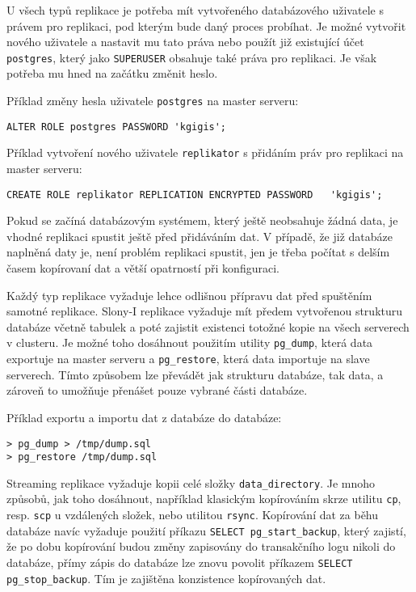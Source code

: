       U všech typů replikace je potřeba mít vytvořeného databázového uživatele s právem pro replikaci, pod kterým bude daný proces probíhat. Je možné vytvořit nového uživatele a nastavit mu tato práva nebo použít již existující účet \texttt{postgres}, který jako \texttt{SUPERUSER} obsahuje také práva pro replikaci. Je však potřeba mu hned na začátku změnit heslo.

Příklad změny hesla uživatele \texttt{postgres} na master serveru:
\begin{lstlisting}
ALTER ROLE postgres PASSWORD 'kgigis';
\end{lstlisting}

Příklad vytvoření nového uživatele \texttt{replikator} s přidáním práv pro replikaci na master serveru: 
\begin{lstlisting}[]
CREATE ROLE replikator REPLICATION ENCRYPTED PASSWORD   'kgigis';
\end{lstlisting}

Pokud se začíná databázovým systémem, který ještě neobsahuje žádná data, je vhodné replikaci spustit ještě před přidáváním dat. V případě, že již databáze naplněná daty je, není problém replikaci spustit, jen je třeba počítat s delším časem kopírovaní dat a větší opatrností při konfiguraci. 

Každý typ replikace vyžaduje lehce odlišnou přípravu dat před spuštěním samotné replikace. 
Slony-I replikace vyžaduje mít předem vytvořenou strukturu databáze včetně tabulek a poté zajistit existenci totožné kopie na všech serverech v clusteru. Je možné toho dosáhnout použitím utility \texttt{pg\_dump}, která data exportuje na master serveru a \texttt{pg\_restore}, která data importuje na slave serverech. Tímto způsobem lze převádět jak strukturu databáze, tak data, a zároveň to umožňuje přenášet pouze vybrané části databáze. 

Příklad exportu a importu dat z databáze do databáze:
\begin{lstlisting}[keywordstyle=\color{purpurova7},identifierstyle=\color{black},stringstyle=\color{black}]
> pg_dump > /tmp/dump.sql
> pg_restore /tmp/dump.sql
\end{lstlisting}

Streaming replikace vyžaduje kopii celé složky \texttt{data\_directory}. Je mnoho způsobů, jak toho dosáhnout, například klasickým kopírováním skrze utilitu \texttt{cp}, resp. \texttt{scp} u vzdálených složek, nebo utilitou \texttt{rsync}. Kopírování dat za běhu databáze navíc vyžaduje použití příkazu \texttt{SELECT pg\_start\_backup}, který zajistí, že po dobu kopírování budou změny zapisovány do transakčního logu nikoli do databáze, přímy zápis do databáze lze znovu povolit příkazem \texttt{SELECT pg\_stop\_backup}. Tím je zajištěna konzistence kopírovaných dat.

